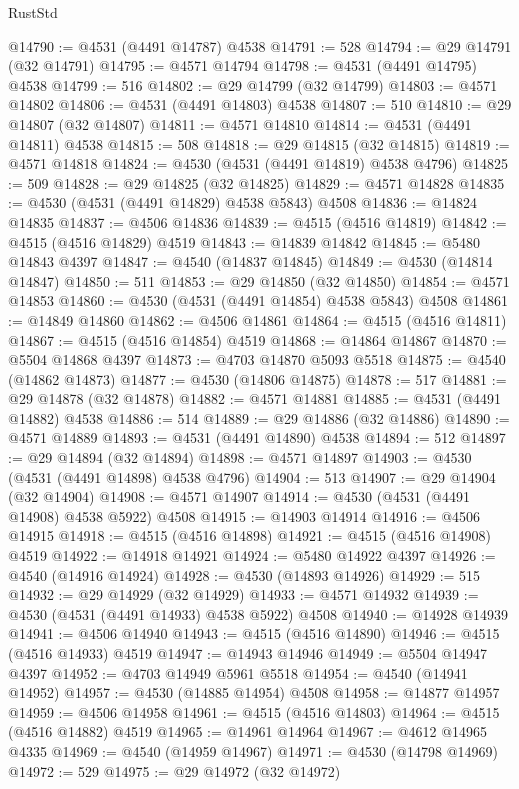 \begin{lexlean}{RustStd}
\begin{coremodule}
{\begin{coremodule}
{{{{{{{{{{{{{{{{{{{{{{{{{{{{{{{{{{{{{{{{{{{{{{{{{{{{{{{@14790 := @4531 (@4491 @14787) @4538
@14791 := 528
@14794 := @29 @14791 (@32 @14791)
@14795 := @4571 @14794
@14798 := @4531 (@4491 @14795) @4538
@14799 := 516
@14802 := @29 @14799 (@32 @14799)
@14803 := @4571 @14802
@14806 := @4531 (@4491 @14803) @4538
@14807 := 510
@14810 := @29 @14807 (@32 @14807)
@14811 := @4571 @14810
@14814 := @4531 (@4491 @14811) @4538
@14815 := 508
@14818 := @29 @14815 (@32 @14815)
@14819 := @4571 @14818
@14824 := @4530 (@4531 (@4491 @14819) @4538 @4796)
@14825 := 509
@14828 := @29 @14825 (@32 @14825)
@14829 := @4571 @14828
@14835 := @4530 (@4531 (@4491 @14829) @4538 @5843) @4508
@14836 := @14824 @14835
@14837 := @4506 @14836
@14839 := @4515 (@4516 @14819)
@14842 := @4515 (@4516 @14829) @4519
@14843 := @14839 @14842
@14845 := @5480 @14843 @4397
@14847 := @4540 (@14837 @14845)
@14849 := @4530 (@14814 @14847)
@14850 := 511
@14853 := @29 @14850 (@32 @14850)
@14854 := @4571 @14853
@14860 := @4530 (@4531 (@4491 @14854) @4538 @5843) @4508
@14861 := @14849 @14860
@14862 := @4506 @14861
@14864 := @4515 (@4516 @14811)
@14867 := @4515 (@4516 @14854) @4519
@14868 := @14864 @14867
@14870 := @5504 @14868 @4397
@14873 := @4703 @14870 @5093 @5518
@14875 := @4540 (@14862 @14873)
@14877 := @4530 (@14806 @14875)
@14878 := 517
@14881 := @29 @14878 (@32 @14878)
@14882 := @4571 @14881
@14885 := @4531 (@4491 @14882) @4538
@14886 := 514
@14889 := @29 @14886 (@32 @14886)
@14890 := @4571 @14889
@14893 := @4531 (@4491 @14890) @4538
@14894 := 512
@14897 := @29 @14894 (@32 @14894)
@14898 := @4571 @14897
@14903 := @4530 (@4531 (@4491 @14898) @4538 @4796)
@14904 := 513
@14907 := @29 @14904 (@32 @14904)
@14908 := @4571 @14907
@14914 := @4530 (@4531 (@4491 @14908) @4538 @5922) @4508
@14915 := @14903 @14914
@14916 := @4506 @14915
@14918 := @4515 (@4516 @14898)
@14921 := @4515 (@4516 @14908) @4519
@14922 := @14918 @14921
@14924 := @5480 @14922 @4397
@14926 := @4540 (@14916 @14924)
@14928 := @4530 (@14893 @14926)
@14929 := 515
@14932 := @29 @14929 (@32 @14929)
@14933 := @4571 @14932
@14939 := @4530 (@4531 (@4491 @14933) @4538 @5922) @4508
@14940 := @14928 @14939
@14941 := @4506 @14940
@14943 := @4515 (@4516 @14890)
@14946 := @4515 (@4516 @14933) @4519
@14947 := @14943 @14946
@14949 := @5504 @14947 @4397
@14952 := @4703 @14949 @5961 @5518
@14954 := @4540 (@14941 @14952)
@14957 := @4530 (@14885 @14954) @4508
@14958 := @14877 @14957
@14959 := @4506 @14958
@14961 := @4515 (@4516 @14803)
@14964 := @4515 (@4516 @14882) @4519
@14965 := @14961 @14964
@14967 := @4612 @14965 @4335
@14969 := @4540 (@14959 @14967)
@14971 := @4530 (@14798 @14969)
@14972 := 529
@14975 := @29 @14972 (@32 @14972)
}}}}}}}}}}}}}}}}}}}}}}}}}}}}}}}}}}}}}}}}}}}}}}}}}}}}}}}
\end{coremodule}}
\end{coremodule}
\end{lexlean}
